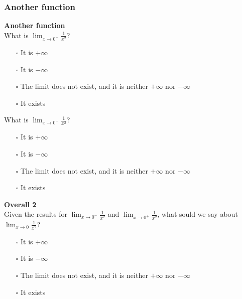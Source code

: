\documentclass[pdftex, brazil, 12pt, twoside]{article}
\begin{document}
\subsubsection{Another function}
\label{u0-lim-quo-another}

\begin{exercise}
  \textbf{Another function}\\
  What is $\displaystyle \lim_{x \to 0^+}\frac{1}{x^2}$?
  \begin{itemize}[noitemsep]
  \item[$\square$] It is $+\infty$
  \item[$\square$] It is $-\infty$
  \item[$\square$] The limit does not exist, and it is neither $+\infty$ nor $-\infty$
  \item[$\square$] It exists
  \end{itemize}

  What is $\displaystyle \lim_{x \to 0^-}\frac{1}{x^2}$?
  \begin{itemize}[noitemsep]
  \item[$\square$] It is $+\infty$
  \item[$\square$] It is $-\infty$
  \item[$\square$] The limit does not exist, and it is neither $+\infty$ nor $-\infty$
  \item[$\square$] It exists
  \end{itemize}
\end{exercise}

\begin{exercise}
  \textbf{Overall 2}\\
  Given the results for $\displaystyle \lim_{x \to 0^-}\frac{1}{x^2}$ and
  $\displaystyle \lim_{x \to 0^+}\frac{1}{x^2}$, what sould we say about
  $\displaystyle \lim_{x \to 0}\frac{1}{x^2}$?
  \begin{itemize}[noitemsep]
  \item[$\square$] It is $+\infty$
  \item[$\square$] It is $-\infty$
  \item[$\square$] The limit does not exist, and it is neither $+\infty$ nor $-\infty$
  \item[$\square$] It exists
  \end{itemize}
\end{exercise}

\end{document}

